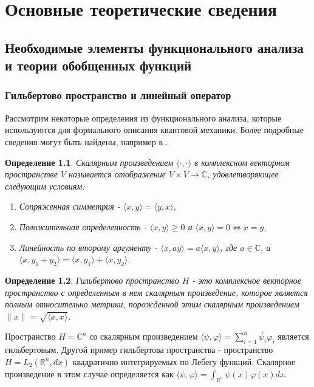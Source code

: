 \documentclass[%
master,         %
subf,           %
href,           %
colorlinks=true %
]{disser}
\numberwithin{equation}{section}
\numberwithin{figure}{section}
\newtheorem{definition}{Определение}[section]
\begin{document}
\chapter{Основные теоретические сведения}

\section{Необходимые элементы функционального анализа и теории обобщенных функций}
\subsection{Гильбертово пространство и линейный оператор}
Рассмотрим некоторые определения из функционального анализа, которые используются для формального описания квантовой механики. Более подробные сведения могут быть найдены, например в \cite{advanced_la}.

\begin{definition}
Скалярным произведением $\langle\cdot,\cdot\rangle$ в комплексном векторном пространстве $V$ называется отображение $V\times V \to \mathbb{C}$, удовлетворяющее следующим условиям:
\begin{enumerate}
\item Сопряженная симметрия - $\langle x, y\rangle = \overline{\langle y, x\rangle}$,
\item Положительная определенность - $\langle x, y\rangle \geq 0$ и $\langle x, y\rangle = 0 \Leftrightarrow x = y$,
\item Линейность по второму аргументу - $\langle x, ay\rangle = a\langle x, y\rangle$, где $a\in\mathbb{C}$, и $\langle x, y_1 + y_2\rangle = \langle x, y_1\rangle + \langle x, y_2\rangle$.
\end{enumerate}
\end{definition}

\begin{definition}
Гильбертово пространство $H$ - это комплексное векторное пространство с определенным в нем скалярным произведение, которое является полным относительно метрики, порожденной этим скалярным произведением $\|x\| = \sqrt{\langle x, x\rangle}$.
\end{definition}

Пространство $H = \mathbb{C}^n$ со скалярным произведением $\langle\psi, \varphi \rangle = \sum_{i = 1}^n \overline{\psi_i}\varphi_i$ является гильбертовым. Другой пример гильбертова пространства - пространство $H = L_2(\mathbb{R}^n, dx)$ квадратично интегрируемых по Лебегу функций. Скалярное произведение в этом случае определяется как $\langle\psi, \varphi \rangle = \int_{\mathbb{R}^n}\overline{\psi(x)}\varphi(x) dx$.
\end{document}
